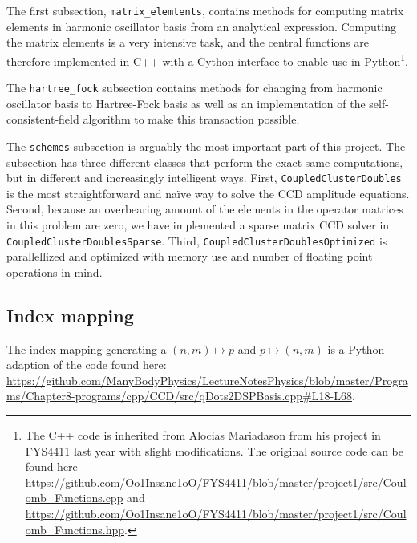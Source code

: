 \documentclass[
    a4paper, aps, twocolumn, floatfix, superscriptaddress,
    nofootinbib]{revtex4-1}
\newcommand{\1}{\mathds{1}}
\begin{document}
        \vspace{10pt}
        \vspace{10pt}

        The first subsection, \texttt{matrix_elemtents},
        contains methods for computing matrix elements in harmonic
        oscillator basis from an analytical
        expression\cite{anisimovas1998energy}.  Computing the matrix
        elements is a very intensive task, and the central functions are
        therefore implemented in C++ with a Cython interface to enable use in
        Python\footnote{The C++ code is inherited from Alocias Mariadason from
        his project in FYS4411 last year with slight modifications. The original
        source code can be found here
        \url{https://github.com/Oo1Insane1oO/FYS4411/blob/master/project1/src/Coulomb_Functions.cpp}
        and
        \url{https://github.com/Oo1Insane1oO/FYS4411/blob/master/project1/src/Coulomb_Functions.hpp}.
        }.

        The \texttt{hartree_fock} subsection contains methods
        for changing from harmonic oscillator basis to Hartree-Fock basis as
        well as an implementation of the self-consistent-field algorithm to
        make this transaction possible.

        The \texttt{schemes} subsection is arguably the most important
        part of this project. The subsection has three different classes that
        perform the exact same computations, but in different and increasingly
        intelligent ways. First, \texttt{CoupledClusterDoubles} is
        the most straightforward and naïve way to solve the CCD amplitude
        equations.  Second, because an overbearing amount of the elements in the
        operator matrices in this problem are zero, we have implemented a sparse
        matrix CCD solver in \texttt{CoupledClusterDoublesSparse}.
        Third, \texttt{CoupledClusterDoublesOptimized} is
        parallellized and optimized with memory use and number of floating point
        operations in mind.

    \subsection{Index mapping}
        The index mapping generating a $(n, m) \mapsto p$ and $p \mapsto (n, m)$
        is a Python adaption of the code found here:
        \url{https://github.com/ManyBodyPhysics/LectureNotesPhysics/blob/master/Programs/Chapter8-programs/cpp/CCD/src/qDots2DSPBasis.cpp#L18-L68}.
\end{document}
